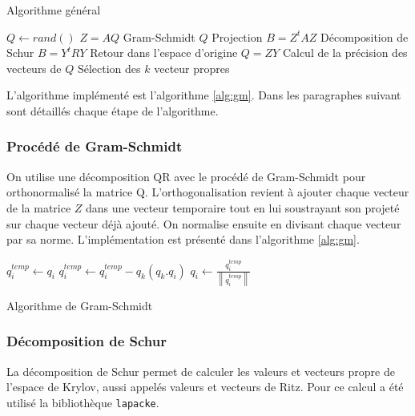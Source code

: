 \documentclass[11pt,a4paper]{article}
\newcommand{\norm}[1]{\left\lVert#1\right\rVert}
\begin{document}
		\begin{algorithm}
			\caption{Algorithme général}
			\label{alg:global}
			\begin{algorithmic}[1]
					\State $Q \gets rand()$
						\State $Z = AQ$
						\State Gram-Schmidt $Q$
						\State Projection $B = Z^tAZ$
						\State Décomposition de Schur $B = Y^tRY$
						\State Retour dans l'espace d'origine $Q = ZY$
						\State Calcul de la précision des vecteurs de $Q$
						\State Sélection des $k$ vecteur propres
					\EndWhile
				\end{algorithmic}
		\end{algorithm}

		L'algorithme implémenté est l'algorithme \ref{alg:gm}.
		Dans les paragraphes suivant sont détaillés chaque étape de l'algorithme.

		\subsubsection{Procédé de Gram-Schmidt}

		On utilise une décomposition QR avec le procédé de Gram-Schmidt pour orthonormalisé la matrice Q. L'orthogonalisation revient à ajouter chaque vecteur de la matrice $Z$ dans une vecteur temporaire tout en lui soustrayant son projeté sur chaque vecteur déjà ajouté. On normalise ensuite en divisant chaque vecteur par sa norme. L'implémentation est présenté dans l'algorithme \ref{alg:gm}.

			\begin{algorithm}
				\begin{algorithmic}[1]
					\For {$i = 0..m-1$}
						\State $q^{temp}_i \gets q_i$
						\For{$k = 0..i$}
						\State $q^{temp}_i \gets q^{temp}_i - q_k(q_k.q_i)$
						\EndFor
					\EndFor
					\For {$i = 0..m-1$}
						\State $q_i \gets \frac{q_i^{temp}}{\norm{q_i^{temp}}}$
					\EndFor
				\end{algorithmic}
				\caption{Algorithme de Gram-Schmidt}
				\label{alg:gm}
			\end{algorithm}

		\subsubsection{Décomposition de Schur}

		La décomposition de Schur permet de calculer les valeurs et vecteurs propre de l'espace de Krylov, aussi appelés valeurs et vecteurs de Ritz. Pour ce calcul a été utilisé la bibliothèque \texttt{lapacke}.
\end{document}
